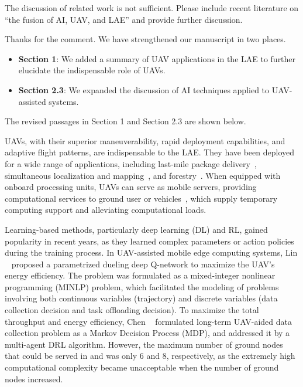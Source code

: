 \begin{revcomment}
	The discussion of related work is not sufficient. Please include recent literature on ``the fusion of AI, UAV, and LAE'' and provide further discussion.
\end{revcomment}
\begin{revresponse}
	Thanks for the comment.
	We have strengthened our manuscript in two places.
	\begin{itemize}
		\item \textbf{Section 1}: We added a summary of UAV applications in the LAE to further elucidate the indispensable role of UAVs.
		\item \textbf{Section 2.3}: We expanded the discussion of AI techniques applied to UAV-assisted systems.
	\end{itemize}
	The revised passages in Section 1 and Section 2.3 are shown below.
	\begin{changes}
		UAVs, with their superior maneuverability, rapid deployment capabilities, and adaptive flight patterns, are indispensable to the LAE.
		They have been deployed for a wide range of applications, including last-mile package delivery~\cite{b-logistics}, simultaneous localization and mapping~\cite{SLAM}, and forestry~\cite{b-agriculture,none-river}.
		When equipped with onboard processing units, UAVs can serve as mobile servers, providing computational services to ground user or vehicles~\cite{a-constspeed2,IoV,b-DL,liao2024energy}, which supply temporary computing support and alleviating computational loads.
	\end{changes}
	\begin{changes}
		Learning-based methods, particularly deep learning (DL) and RL, gained popularity in recent years, as they learned complex parameters or action policies during the training process.
		In UAV-assisted mobile edge computing systems, Lin \etal~\cite{b-DL} proposed a parametrized dueling deep Q-network to maximize the UAV's energy efficiency.
		The problem was formulated as a mixed-integer nonlinear programming (MINLP) problem, which facilitated the modeling of problems involving both continuous variables (\eg trajectory) and discrete variables (\eg data collection decision and task offloading decision).
		To maximize the total throughput and energy efficiency, Chen \etal~\cite{b-RL} formulated long-term UAV-aided data collection problem as a Markov Decision Process (MDP), and addressed it by a multi-agent DRL algorithm.
		However, the maximum number of ground nodes that could be served in \cite{b-DL} and \cite{b-RL} was only 6 and 8, respectively, as the extremely high computational complexity became unacceptable when the number of ground nodes increased.

\end{changes}
\end{revresponse}
